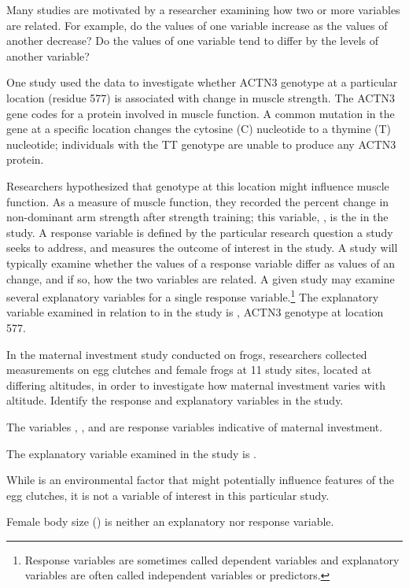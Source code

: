 Many studies are motivated by a researcher examining how two or more variables are related. For example, do the values of one variable increase as the values of another decrease? Do the values of one variable tend to differ by the levels of another variable?

One study used the  data to investigate whether ACTN3 genotype at a particular location (residue 577) is associated with change in muscle strength. The ACTN3 gene codes for a protein involved in muscle function. A common mutation in the gene at a specific location changes the cytosine (C) nucleotide to a thymine (T) nucleotide; individuals with the TT genotype are unable to produce any ACTN3 protein. 

Researchers hypothesized that genotype at this location might influence muscle function. As a measure of muscle function, they recorded the percent change in non-dominant arm strength after strength training; this variable, , is the  in the study. A response variable is defined by the particular research question a study seeks to address, and measures the outcome of interest in the study. A study will typically examine whether the values of a response variable differ as values of an  change, and if so, how the two variables are related. A given study may examine several explanatory variables for a single response variable.\footnote{Response variables are sometimes called dependent variables and explanatory variables are often called independent variables or predictors.} The explanatory variable examined in relation to  in the study is , ACTN3 genotype at location 577. 

\begin{examplewrap}
\begin{nexample}{In the maternal investment study conducted on frogs, researchers collected measurements on egg clutches and female frogs at 11 study sites, located at differing altitudes, in order to investigate how maternal investment varies with altitude. Identify the response and explanatory variables in the study.}

The variables , , and  are response variables indicative of maternal investment.
	
The explanatory variable examined in the study is . 

While  is an environmental factor that might potentially influence features of the egg clutches, it is not a variable of interest in this particular study.

Female body size () is neither an explanatory nor response variable.

\label{frogVarTypesEx}
\end{nexample}
\end{examplewrap}

